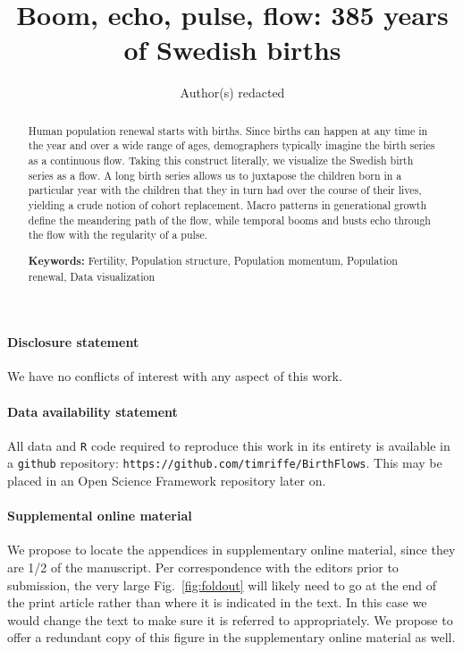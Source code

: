 \documentclass{article}
\begin{document}
 \paragraph{Disclosure statement} We have no conflicts of interest with any aspect of this work. 
 
 \paragraph{Data availability statement} All data and \texttt{R} code required to reproduce this work in its entirety is available in a \texttt{github} repository: \texttt{https://github.com/timriffe/BirthFlows}. This may be placed in an Open Science Framework repository later on.
 
 \paragraph{Supplemental online material} We propose to locate the appendices in supplementary online material, since they are 1/2 of the manuscript. Per correspondence with the editors prior to submission, the very large Fig.~\ref{fig:foldout} will likely need to go at the end of the print article rather than where it is indicated in the text. In this case we would change the text to make sure it is referred to appropriately. We propose to offer a redundant copy of this figure in the supplementary online material as well.

\doublespacing
 \pagebreak
\title{Boom, echo, pulse, flow: 385 years of Swedish births}
 \author{Author(s) redacted}
\maketitle

\begin{abstract}
Human population renewal starts with births. Since births can happen at any
time in the year and over a wide range of ages, demographers typically imagine
the birth series as a continuous flow. Taking this construct literally, we
visualize the Swedish birth series as a flow. A long birth series allows us to
juxtapose the children born in a particular year with the children that
they in turn had over the course of their lives, yielding a crude notion of
cohort replacement. Macro patterns in generational growth define the meandering
path of the flow, while temporal booms and busts echo through the flow with the
regularity of a pulse.
\vspace{1em}

{\bf Keywords:} Fertility, Population structure, Population momentum, Population renewal, Data visualization
\end{abstract}
\end{document}
